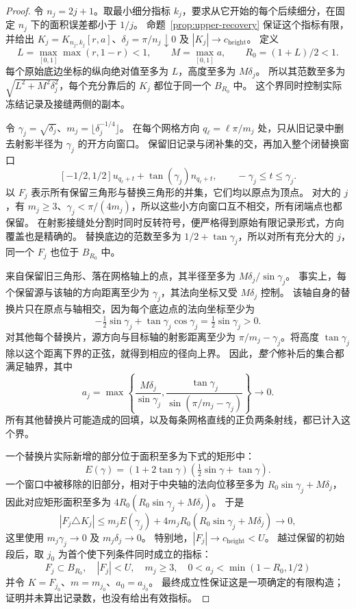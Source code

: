 \begin{proof}
令 $n_j=2j+1$。取最小细分指标 $k_j$，要求从它开始的每个后续细分，在固定 $n_j$ 下的面积误差都小于 $1/j$。
命题~\ref{prop:upper-recovery} 保证这个指标有限，并给出 $K_j=K_{n_j,k_j}[r,a]$、$\delta_j=\pi/n_j\downarrow0$ 及 $|K_j|\to c_{\mathrm{height}}$。
定义
\[
 L=\max_{[0,1]}\max(r,1-r)<1,\qquad M=\max_{[0,1]}a,
 \qquad R_0=(1+L)/2<1.
\]
每个原始底边坐标的纵向绝对值至多为 $L$，高度至多为 $M\delta_j$。
所以其范数至多为 $\sqrt{L^2+M^2\delta_j^2}$，每个充分靠后的 $K_j$ 都位于同一个 $B_{R_0}$ 中。
这个界同时控制实际冻结记录及接缝两侧的副本。

令 $\gamma_j=\sqrt{\delta_j}$、$m_j=\lfloor\delta_j^{-1/4}\rfloor$。
在每个网格方向 $q_\ell=\ell\pi/m_j$ 处，只从旧记录中删去射影半径为 $\gamma_j$ 的开方向窗口。
保留旧记录与闭补集的交，再加入整个闭替换窗口
\[
 [-1/2,1/2]u_{q_\ell+t}+\tan(\gamma_j)n_{q_\ell+t},
                         \qquad -\gamma_j\le t\le\gamma_j.
\]
以 $F_j$ 表示所有保留三角形与替换三角形的并集，它们均以原点为顶点。
对大的 $j$，有 $m_j\ge3$、$\gamma_j<\pi/(4m_j)$，所以这些小方向窗口互不相交，所有闭端点也都保留。
在射影接缝处分割时同时反转符号，便严格得到原始有限记录形式，方向覆盖也是精确的。
替换底边的范数至多为 $1/2+\tan\gamma_j$，所以对所有充分大的 $j$，同一个 $F_j$ 也位于 $B_{R_0}$ 中。

来自保留旧三角形、落在网格轴上的点，其半径至多为 $M\delta_j/\sin\gamma_j$。
事实上，每个保留源与该轴的方向距离至少为 $\gamma_j$，其法向坐标又受 $M\delta_j$ 控制。
该轴自身的替换片只在原点与轴相交，因为每个底边点的法向坐标至少为
\[
 -\tfrac12\sin\gamma_j+\tan\gamma_j\cos\gamma_j
                                      =\tfrac12\sin\gamma_j>0.
\]
对其他每个替换片，源方向与目标轴的射影距离至少为 $\pi/m_j-\gamma_j$。将高度 $\tan\gamma_j$ 除以这个距离下界的正弦，就得到相应的径向上界。
因此，\emph{整个}修补后的集合都满足轴界，其中
\begin{equation}\label{eq:upper-short-axis-radius}
 a_j=\max\left\{\frac{M\delta_j}{\sin\gamma_j},
              \frac{\tan\gamma_j}{\sin(\pi/m_j-\gamma_j)}\right\}\longrightarrow0.
\end{equation}
所有其他替换片可能造成的回填，以及每条网格直线的正负两条射线，都已计入这个界。

一个替换片实际新增的部分位于面积至多为下式的矩形中：
\[
 E(\gamma)=(1+2\tan\gamma)
                           (\tfrac12\sin\gamma+\tan\gamma).
\]
一个窗口中被移除的旧部分，相对于中央轴的法向位移至多为 $R_0\sin\gamma_j+M\delta_j$，因此对应矩形面积至多为 $4R_0(R_0\sin\gamma_j+M\delta_j)$。
于是
\[
 |F_j\triangle K_j|\le m_jE(\gamma_j)
       +4m_jR_0(R_0\sin\gamma_j+M\delta_j)\longrightarrow0,
\]
这里使用 $m_j\gamma_j\to0$ 及 $m_j\delta_j\to0$。
特别地，$|F_j|\to c_{\mathrm{height}}<U$。
越过保留的初始段后，取 $j_0$ 为首个使下列条件同时成立的指标：
\[
 F_j\subset B_{R_0},\quad |F_j|<U,\quad m_j\ge3,
 \quad 0<a_j<\min(1-R_0,1/2)
\]
并令 $K=F_{j_0}$、$m=m_{j_0}$、$a_0=a_{j_0}$。
最终成立性保证这是一项确定的有限构造；证明并未算出记录数，也没有给出有效指标。
\end{proof}

